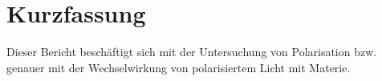 \section{Kurzfassung}

	Dieser Bericht beschäftigt sich mit der Untersuchung von Polarisation bzw. genauer mit der Wechselwirkung von polarisiertem Licht mit Materie.
	